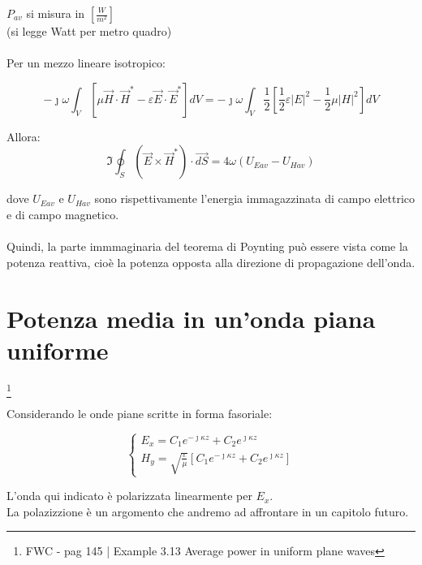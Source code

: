 $P_{av}$ si misura in $[\frac{W}{m^2}]$ \\ (si legge Watt per metro quadro)  \\ \\ 

Per un mezzo lineare isotropico:

{
    \Large
    \begin{equation}
    - \jmath \omega \int_V [\mu \vec{H} \cdot \vec{H}^{*} - \varepsilon \vec{E} \cdot \vec{E}^{*}] dV = -\jmath \omega \int_V \frac{1}{2} [\frac{1}{2} \varepsilon \left|E\right|^{2} - \frac{1}{2} \mu \left|H\right|^{2} ] dV    
    \end{equation}
}

Allora: 
{\Large \begin{equation}
    \Im\oint_S (\vec{E} \times \vec{H}^{*}) \cdot \vec{dS} = 4\omega (U_{Eav} - U_{Hav})
\end{equation}}

dove $U_{Eav}$ e $U_{Hav}$ sono rispettivamente l'energia immagazzinata di campo elettrico e di campo magnetico. \\ \\ 

Quindi, la parte immmaginaria del teorema di Poynting può essere vista come la potenza reattiva, cioè la potenza opposta 
alla direzione di propagazione dell'onda. 

\newpage 

\section{Potenza media in un'onda piana uniforme} 

\footnote{FWC - pag 145 | Example 3.13 Average power in uniform plane waves} 

Considerando le onde piane scritte in forma fasoriale: 

{\Large \begin{equation}
    \begin{cases}
        E_x = C_1 e^{-\jmath \kappa z} + C_2 e^{\jmath \kappa z} \\ 
        H_y = \sqrt{\frac{\varepsilon}{\mu}} [C_1 e^{-\jmath \kappa z} + C_2 e^{\jmath \kappa z}] 
    \end{cases}
\end{equation}}

\begin{tcolorbox}
    L'onda qui indicato è polarizzata linearmente per $E_x$. \\ 
    La polazizzione è un argomento che andremo ad affrontare in un capitolo futuro. 
\end{tcolorbox}


